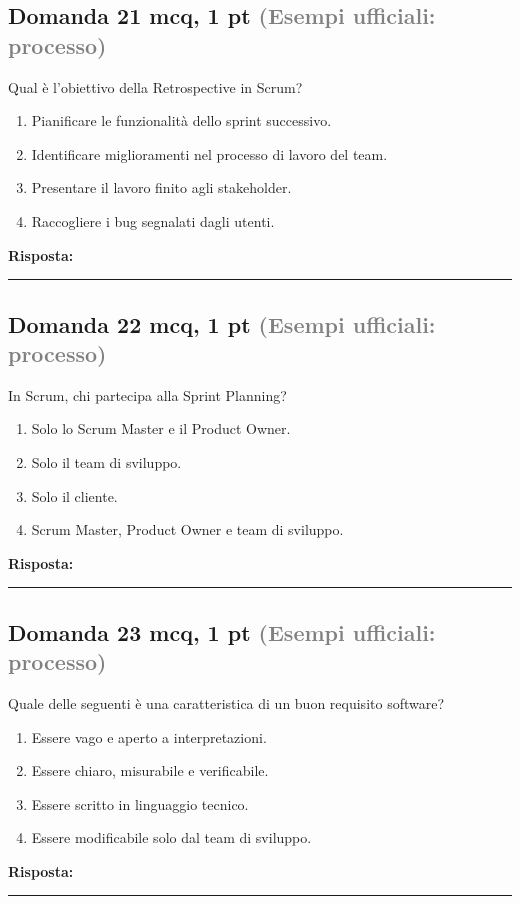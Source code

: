 \documentclass[a4paper,11pt]{article}
\begin{document}
\subsection*{Domanda 21 \hfill {\small mcq, 1 pt \textcolor{gray}{(Esempi ufficiali: processo)}}}
Qual è l'obiettivo della Retrospective in Scrum?

\begin{enumerate}[label=\alph*)]
\item Pianificare le funzionalità dello sprint successivo.
\item Identificare miglioramenti nel processo di lavoro del team.
\item Presentare il lavoro finito agli stakeholder.
\item Raccogliere i bug segnalati dagli utenti.
\end{enumerate}
\vspace{0.2cm}
\noindent\textbf{Risposta:}\par
\vspace{1.5cm}\hrule


\subsection*{Domanda 22 \hfill {\small mcq, 1 pt \textcolor{gray}{(Esempi ufficiali: processo)}}}
In Scrum, chi partecipa alla Sprint Planning?

\begin{enumerate}[label=\alph*)]
\item Solo lo Scrum Master e il Product Owner.
\item Solo il team di sviluppo.
\item Solo il cliente.
\item Scrum Master, Product Owner e team di sviluppo.
\end{enumerate}
\vspace{0.2cm}
\noindent\textbf{Risposta:}\par
\vspace{1.5cm}\hrule


\subsection*{Domanda 23 \hfill {\small mcq, 1 pt \textcolor{gray}{(Esempi ufficiali: processo)}}}
Quale delle seguenti è una caratteristica di un buon requisito software?

\begin{enumerate}[label=\alph*)]
\item Essere vago e aperto a interpretazioni.
\item Essere chiaro, misurabile e verificabile.
\item Essere scritto in linguaggio tecnico.
\item Essere modificabile solo dal team di sviluppo.
\end{enumerate}
\vspace{0.2cm}
\noindent\textbf{Risposta:}\par
\vspace{1.5cm}\hrule
\end{document}
